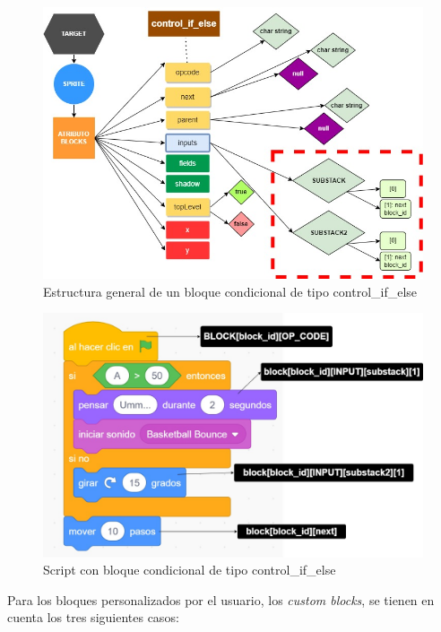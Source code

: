 \documentclass[a4paper, 12pt]{book}
\begin{document}
\begin{figure}
  \centering
  \includegraphics[width=15cm, keepaspectratio]{img/controlblock_spe.jpg}
  \caption{Estructura general de un bloque condicional de tipo control\_if\_else}
  \label{fig:controlblock_spe}
\end{figure}

\begin{figure}
  \centering
  \includegraphics[width=13cm, keepaspectratio]{img/scratch_special.jpg}
  \caption{Script con bloque condicional de tipo control\_if\_else}
  \label{fig:scratch_special}
\end{figure}

\newpage 
Para los bloques personalizados por el usuario, los \textit{custom blocks}, se tienen en cuenta los tres siguientes casos:
\end{document}
